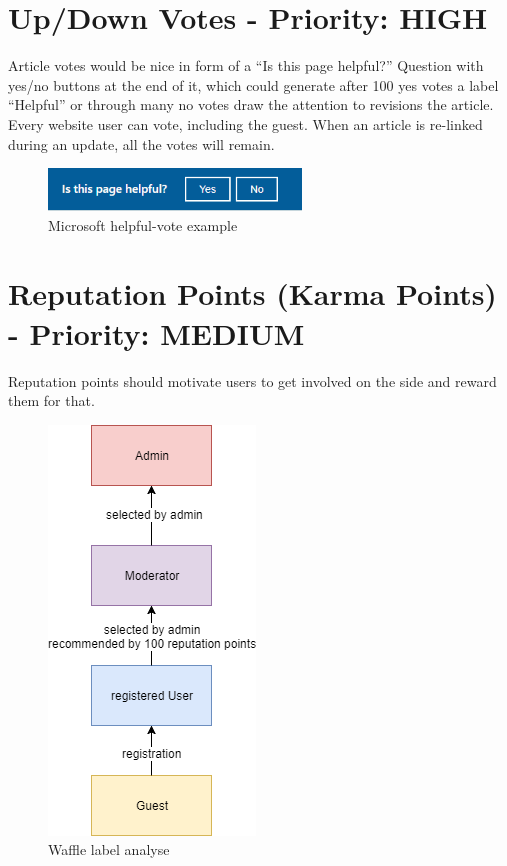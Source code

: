 \section{Up/Down Votes - Priority: HIGH}
\begin{tcolorbox}[breakable,colback=red!14,colframe=red!40!black,title=UPDATE 30/11/2017]
Article votes would be nice in form of a “Is this page helpful?” Question with yes/no buttons at the end of it, which could generate after 100 yes votes a label “Helpful” or through many no votes draw the attention to revisions the article.
Every website user can vote, including the guest. When an article is re-linked during an update, all the votes will remain.
\end{tcolorbox}

\begin{figure}[h] 
    \centering
    \includegraphics[width=0.6\textwidth]{Pictures/helpful_vote}
    \caption{Microsoft helpful-vote example}
\end{figure} 

\section{Reputation Points (Karma Points) - Priority: MEDIUM}
\begin{tcolorbox}[breakable,colback=red!14,colframe=red!40!black,title=UPDATE 30/11/2017]
Reputation points should motivate users to get involved on the side and reward them for that.\\
\end{tcolorbox}

\begin{figure}[h] 
    \centering
    \includegraphics[scale=0.6]{Pictures/UserStructure}
    \caption{Waffle label analyse}
\end{figure} 


